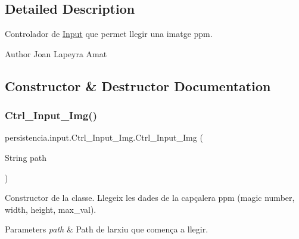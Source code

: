 \subsection{Detailed Description}
Controlador de \hyperlink{classpersistencia_1_1input_1_1Input}{Input} que permet llegir una imatge ppm. 

\begin{DoxyAuthor}{Author}
Joan Lapeyra Amat 
\end{DoxyAuthor}


\subsection{Constructor \& Destructor Documentation}
\mbox{\label{classpersistencia_1_1input_1_1Ctrl__Input__Img_a79318a62df31dfd107554e92e29f6d9a}} 
\subsubsection{\texorpdfstring{Ctrl\+\_\+\+Input\+\_\+\+Img()}{Ctrl\_Input\_Img()}\hspace{0.1cm}{\footnotesize\ttfamily [1/2]}}
{\footnotesize\ttfamily persistencia.\+input.\+Ctrl\+\_\+\+Input\+\_\+\+Img.\+Ctrl\+\_\+\+Input\+\_\+\+Img (\begin{DoxyParamCaption}\item[{String}]{path }\end{DoxyParamCaption})\hspace{0.3cm}{\ttfamily [inline]}}



Constructor de la classe. Llegeix les dades de la capçalera ppm (magic number, width, height, max\+\_\+val). 


\begin{DoxyParams}{Parameters}
{\em path} & Path de l\textquotesingle{}arxiu que comença a llegir. \\
\hline
\end{DoxyParams}

